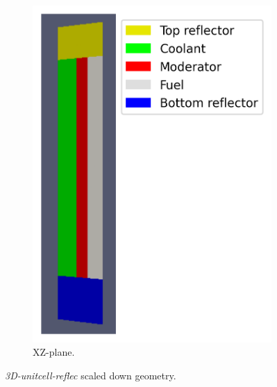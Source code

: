 \documentclass[11pt,letterpaper]{article}
\begin{document}
\begin{figure}[htbp!]
\begin{subfigure}[t]{0.4\textwidth}
			\includegraphics[width=\linewidth]{3D-unitcell-reflec-mesh}
			\caption{XZ-plane.}
		\end{subfigure}
		\hfill
		\caption{\textit{3D-unitcell-reflec} scaled down geometry.}
		\label{fig:3D-unitcell-reflec}
	\end{figure}
\end{document}
